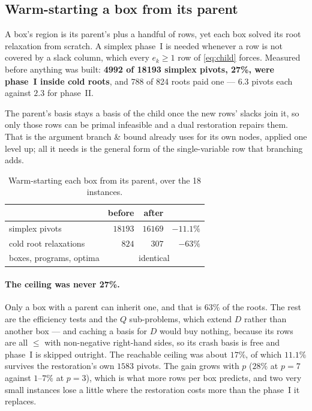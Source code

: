 \documentclass[11pt,a4paper]{article}
\newcommand{\Dset}{D}
\begin{document}
\subsection{Warm-starting a box from its parent}
\label{sec:warm}

A box's region is its parent's plus a handful of rows, yet each box solved its
root relaxation from scratch. A simplex phase~I is needed whenever a row is not
covered by a slack column, which every $e_k \geqslant 1$ row of
\eqref{eq:child} forces. Measured before anything was built: \textbf{4992 of
18193 simplex pivots, 27\%, were phase~I inside cold roots}, and 788 of 824
roots paid one --- $6.3$ pivots each against $2.3$ for phase~II.

The parent's basis stays a basis of the child once the new rows' slacks join
it, so only those rows can be primal infeasible and a dual restoration repairs
them. That is the argument branch \& bound already uses for its own nodes,
applied one level up; all it needs is the general form of the single-variable
row that branching adds.

\begin{table}[h]
\centering
\caption{Warm-starting each box from its parent, over the 18 instances.}
\begin{tabular}{lrrr}
\toprule
 & before & after & \\
\midrule
simplex pivots            & $18193$ & $16169$ & $-11.1\%$ \\
cold root relaxations     & $824$   & $307$   & $-63\%$ \\
boxes, programs, optima   & \multicolumn{3}{c}{identical} \\
\bottomrule
\end{tabular}
\end{table}

\paragraph{The ceiling was never 27\%.} Only a box with a parent can inherit
one, and that is 63\% of the roots. The rest are the efficiency tests and the
$Q$ sub-problems, which extend $\Dset$ rather than another box --- and caching
a basis for $\Dset$ would buy nothing, because its rows are all $\leqslant$
with non-negative right-hand sides, so its crash basis is free and phase~I is
skipped outright. The reachable ceiling was about $17\%$, of which $11.1\%$
survives the restoration's own $1583$ pivots. The gain grows with $p$ ($28\%$
at $p = 7$ against $1$--$7\%$ at $p = 3$), which is what more rows per box
predicts, and two very small instances lose a little where the restoration
costs more than the phase~I it replaces.
\end{document}
